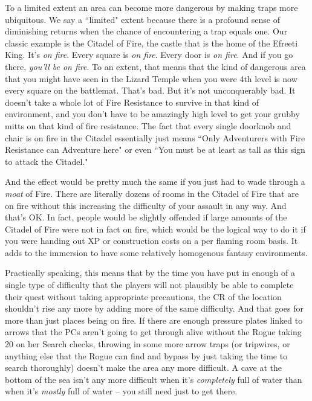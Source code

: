 To a limited extent an area can become more dangerous by making traps more ubiquitous. We say a ``limited" extent because there is a profound sense of diminishing returns when the chance of encountering a trap equals one. Our classic example is the Citadel of Fire, the castle that is the home of the Efreeti King. It's \textit{on fire}. Every square is \textit{on fire}. Every door is \textit{on fire}. And if you go there, \textit{you'll be on fire}. To an extent, that means that the kind of dangerous area that you might have seen in the Lizard Temple when you were 4th level is now every square on the battlemat. That's bad. But it's not unconquerably bad. It doesn't take a whole lot of Fire Resistance to survive in that kind of environment, and you don't have to be amazingly high level to get your grubby mitts on that kind of fire resistance. The fact that every single doorknob and chair is on fire in the Citadel essentially just means ``Only Adventurers with Fire Resistance can Adventure here" or even ``You must be at least as tall as this sign to attack the Citadel."

And the effect would be pretty much the same if you just had to wade through a \textit{moat} of Fire. There are literally dozens of rooms in the Citadel of Fire that are on fire without this increasing the difficulty of your assault in any way. And that's OK. In fact, people would be slightly offended if large amounts of the Citadel of Fire were not in fact on fire, which would be the logical way to do it if you were handing out XP or construction costs on a per flaming room basis. It adds to the immersion to have some relatively homogenous fantasy environments.

Practically speaking, this means that by the time you have put in enough of a single type of difficulty that the players will not plausibly be able to complete their quest without taking appropriate precautions, the CR of the location shouldn't rise any more by adding more of the same difficulty. And that goes for more than just places being on fire. If there are enough pressure plates linked to arrows that the PCs aren't going to get through alive without the Rogue taking 20 on her Search checks, throwing in some more arrow traps (or tripwires, or anything else that the Rogue can find and bypass by just taking the time to search thoroughly) doesn't make the area any more difficult. A cave at the bottom of the sea isn't any more difficult when it's \textit{completely} full of water than when it's \textit{mostly} full of water -- you still need  just to get there.

